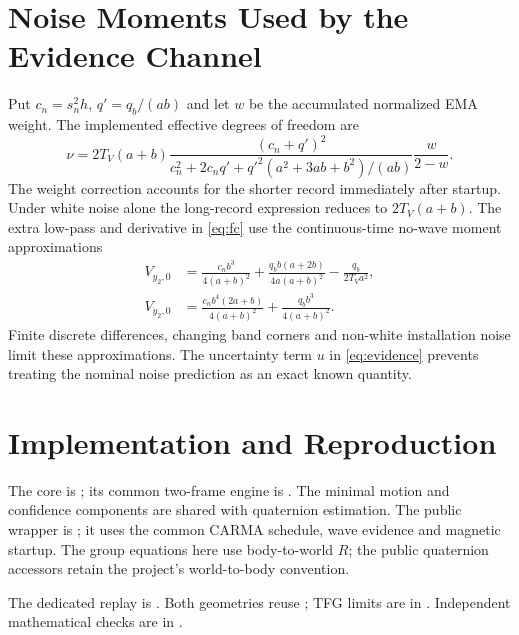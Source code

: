 \documentclass[conference]{IEEEtran}
\begin{document}
\section{Noise Moments Used by the Evidence Channel}
\label{app:evidence}
Put $c_n=s_n^2h$, $q'=q_b/(ab)$ and let $w$ be the accumulated normalized
EMA weight. The implemented effective degrees of freedom are
\begin{equation}
 \nu=2T_V(a+b)\frac{(c_n+q')^2}
 {c_n^2+2c_nq'+q'^2(a^2+3ab+b^2)/(ab)}\frac{w}{2-w}.
 \label{eq:nu}
\end{equation}
The weight correction accounts for the shorter record immediately after
startup. Under white noise alone the long-record expression reduces to
$2T_V(a+b)$. The extra low-pass and derivative in \cref{eq:fc} use
the continuous-time no-wave moment approximations
\begin{align}
 V_{y_2,0}&=\frac{c_n b^3}{4(a+b)^2}
       +\frac{q_b b(a+2b)}{4a(a+b)^2}-\frac{q_b}{2T_Va^2},\nonumber\\
 V_{\dot y_2,0}&=\frac{c_n b^4(2a+b)}{4(a+b)^2}
                       +\frac{q_b b^3}{4(a+b)^2}.
 \label{eq:noisemoments}
\end{align}
Finite discrete differences, changing band corners and non-white
installation noise limit these approximations. The uncertainty term $u$
in \cref{eq:evidence} prevents treating the nominal noise prediction as
an exact known quantity.


\section{Implementation and Reproduction}
The core is ;
its common two-frame engine is
. The minimal motion and
confidence components are shared with quaternion estimation. The public wrapper
is ; it uses the common CARMA schedule,
wave evidence and magnetic startup. The group equations here use body-to-world
$R$; the public quaternion accessors retain the project's world-to-body convention.

The dedicated replay is
.
Both geometries reuse ; TFG limits are in
.
Independent mathematical checks are in
.
\end{document}
